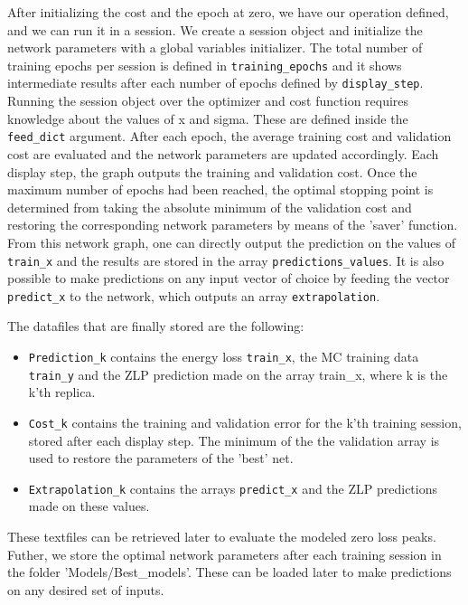 After initializing the cost and the epoch at zero, we have our operation defined, and we can run it in a session. 
%
We create a session object and initialize the network parameters with a global variables initializer.
%
The total number of training epochs per session is defined in {\tt training\_epochs} and it shows intermediate 
results after each number of epochs defined by {\tt display\_step}. 
%
Running the session object over the optimizer and cost function requires knowledge about the values of x and sigma. 
These are defined inside the {\tt feed\_dict} argument. 
%
After each epoch, the average training cost and validation cost are evaluated and the network parameters 
are updated accordingly.
%
Each display step, the graph outputs the training and validation cost. 
Once the maximum number of epochs 
had been reached, the optimal stopping point is determined from 
taking the absolute minimum of the validation cost
and restoring the corresponding network parameters by means of the 'saver' function.
%
From this network graph, one can directly output the prediction on the values of {\tt train\_x} and
the results are stored in the array {\tt predictions\_values}.
%
It is also possible to make predictions on any input vector of choice by feeding 
the vector {\tt predict\_x} to the 
network, which outputs an array {\tt extrapolation}.
%

The datafiles that are finally stored are the following:

\begin{itemize}

\item {\tt Prediction\_k} contains the energy loss {\tt train\_x}, the MC training data {\tt train\_y}
and the ZLP prediction made on the array train\_x, where k is the k'th replica. 
\item {\tt Cost\_k} contains the training and validation error for the k'th training session, 
stored after each display step. 
The minimum of the the validation array is used to restore the parameters of the 'best' net.
\item {\tt Extrapolation\_k} contains the arrays {\tt predict\_x} and the ZLP predictions made on these values. 
\end{itemize}
These textfiles can be retrieved later to evaluate the modeled zero loss peaks.
%
Futher, we store the optimal network parameters after each training session in the folder 'Models/Best\_models'. 
%
These can be loaded later to make predictions on any desired set of inputs. 


